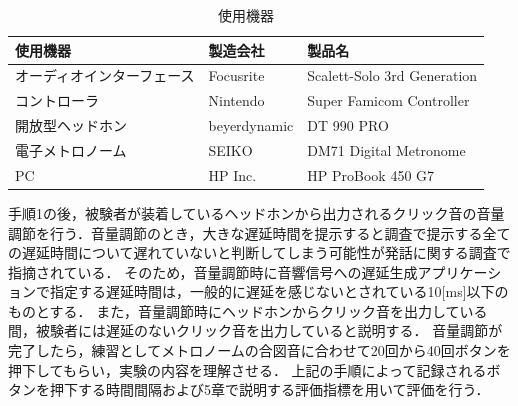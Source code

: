 \begin{table}[tbp]
  \caption{使用機器}
  \label{table:device}
  \centering
  \begin{tabular}{lll}
    \hline
    使用機器 & 製造会社 & 製品名\\
    \hline \hline
    オーディオインターフェース & Focusrite & Scalett-Solo 3rd Generation\\
    コントローラ  & Nintendo & Super Famicom Controller\\
    開放型ヘッドホン & beyerdynamic & DT 990 PRO\\
    電子メトロノーム  & SEIKO  & DM71 Digital Metronome \\
    PC  & HP Inc. & HP ProBook 450 G7 
\\
    \hline
  \end{tabular}
\end{table}
手順1の後，被験者が装着しているヘッドホンから出力されるクリック音の音量調節を行う．音量調節のとき，大きな遅延時間を提示すると調査で提示する全ての遅延時間について遅れていないと判断してしまう可能性が発話に関する調査で指摘されている\cite{Soturonn-takahashi}．
そのため，音量調節時に音響信号への遅延生成アプリケーションで指定する遅延時間は，一般的に遅延を感じないとされている10[ms]以下のものとする．
また，音量調節時にヘッドホンからクリック音を出力している間，被験者には遅延のないクリック音を出力していると説明する．
音量調節が完了したら，練習としてメトロノームの合図音に合わせて20回から40回ボタンを押下してもらい，実験の内容を理解させる．
上記の手順によって記録されるボタンを押下する時間間隔および5章で説明する評価指標を用いて評価を行う．
